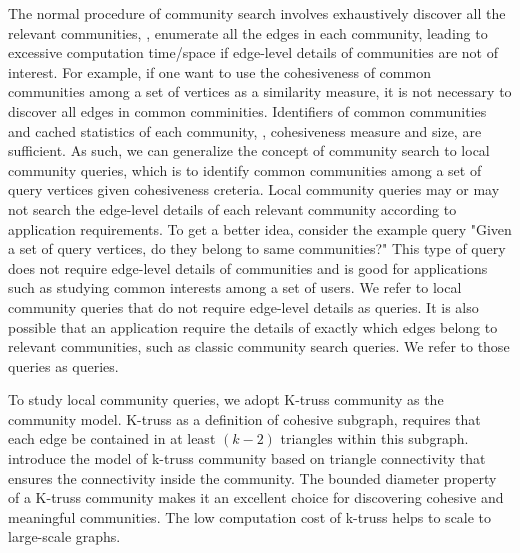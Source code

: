 The normal procedure of community search involves exhaustively discover all the relevant communities, \ie, enumerate all the edges in each community, leading to excessive computation time/space if edge-level details of communities are not of interest. %
For example, if one want to use the cohesiveness of common communities among a set of vertices as a similarity measure, it is not necessary to discover all edges in common comminities. Identifiers of common communities and cached statistics of each community, \eg, cohesiveness measure and size, are sufficient. As such, we can generalize the concept of community search to local community queries, which is to identify common communities among a set of query vertices given cohesiveness creteria. Local community queries may or may not search the edge-level details of each relevant community according to application requirements. To get a better idea, consider the example query "Given a set of query vertices, do they belong to same communities?" This type of query does not require edge-level details of communities and is good for applications such as studying common interests among a set of users. We refer to local community queries that do not require edge-level details as \toplevelprob{} queries. It is also possible that an application require the details of exactly which edges belong to relevant communities, such as classic community search queries. We refer to those queries as \bottomlevelprob{} queries.

To study local community queries, we adopt K-truss community as the community model. K-truss as a definition of cohesive subgraph, requires that each edge be contained in at least $(k - 2)$ triangles within this subgraph. \cite{huang2014querying} introduce the model of k-truss community based on triangle connectivity that ensures the connectivity inside the community. The bounded diameter property of a K-truss community makes it an excellent choice for discovering cohesive and meaningful communities. The low computation cost of k-truss helps to scale to large-scale graphs.

